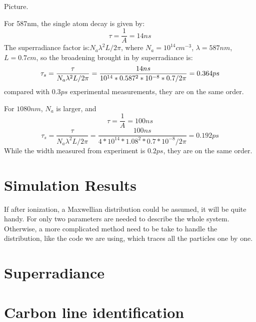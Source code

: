 Picture.

For 587nm, the single atom decay is given by:
\begin{equation}
\tau = \frac{1}{A} = 14ns
\end{equation}
The superradiance factor is:$N_a\lambda^2L/2\pi$, where
$N_a=10^{14}cm^{-3}$, $\lambda=587nm$, $L=0.7cm$, so the broadening
brought in by superradiance is:
\begin{equation}
\tau_s=\frac{\tau}{N_a\lambda^2L/2\pi} \\
= \frac{14ns}{10^{14}*0.587^2*10^{-8}*0.7/2\pi} = 0.364ps
\end{equation}
compared with $0.3ps$ experimental measurements, they are on the same
order.

For $1080nm$, $N_a$ is larger, and
\begin{equation}
\tau=\frac{1}{A}=100ns
\end{equation}
\begin{equation}
\tau_s=\frac{\tau}{N_a\lambda^2L/2\pi}=\frac{100ns}{4*10^{14}*1.08^2*0.7*10^{-8}/2\pi}=0.192ps
\end{equation}
While the width measured from experiment is $0.2ps$, they are on the
same order.

\section{Simulation Results}
If after ionization, a Maxwellian distribution could be assumed, it
will be quite handy. For only two parameters are needed to describe
the whole system. Otherwise, a more complicated method need to be take
to handle the distribution, like the code we are using, which traces
all the particles one by one.


\section{Superradiance}
\section{Carbon line identification}


%



